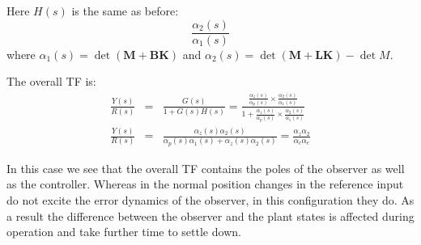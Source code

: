 Here $H(s)$ is the same as before:
\[
\frac{\alpha_2(s)}{\alpha_1(s)}
\]
where $\alpha_1(s)=\det(\mathbf{M}+\mathbf{BK})$ and $\alpha_2(s)=\det(\mathbf{M}+\mathbf{LK})-\det{M}$.
 
The overall TF is:
\begin{eqnarray*}
	\frac{Y(s)}{R(s)} &=& \frac{G(s)}{1+G(s)H(s)}= \frac{\frac{\alpha_z(s)}{\alpha_p(s)}\times\frac{\alpha_2(s)}{\alpha_1(s)}}{1+\frac{\alpha_z(s)}{\alpha_p(s)}\times\frac{\alpha_2(s)}{\alpha_1(s)}} \\
	\frac{Y(s)}{R(s)} &=& \frac{\alpha_z(s)\alpha_2(s)}{\alpha_p(s)\alpha_1(s)+\alpha_z(s)\alpha_2(s)}=\frac{\alpha_z\alpha_2}{\alpha_c\alpha_e}
\end{eqnarray*}
 

In this case we see that the overall TF contains the poles of the observer as well as the controller.
Whereas in the normal position changes in the reference input do not excite the error dynamics of the observer, in this configuration they do.
As a result the difference between the observer and the plant states is affected during operation and take further time to settle down.








\endinput

